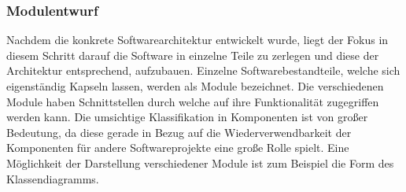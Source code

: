 \subsubsection{Modulentwurf}
Nachdem die konkrete Softwarearchitektur entwickelt wurde, liegt der Fokus in diesem Schritt darauf die Software in einzelne Teile zu zerlegen und diese der Architektur entsprechend, aufzubauen. Einzelne Softwarebestandteile, welche sich eigenständig Kapseln lassen, werden als Module bezeichnet. Die verschiedenen Module haben Schnittstellen durch welche auf ihre Funktionalität zugegriffen werden kann. Die umsichtige Klassifikation in Komponenten ist von großer Bedeutung, da diese gerade in Bezug auf die Wiederverwendbarkeit der Komponenten für andere Softwareprojekte eine große Rolle spielt. Eine Möglichkeit der Darstellung  verschiedener Module ist zum Beispiel die Form des Klassendiagramms.
